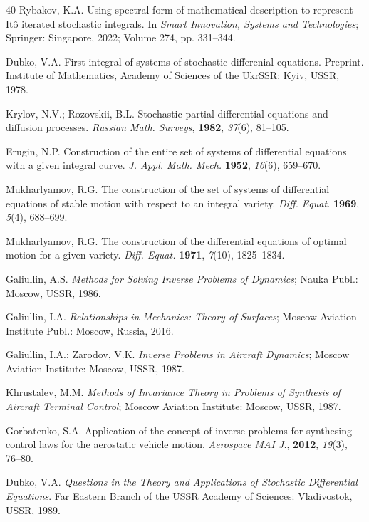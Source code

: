 \documentclass[10pt,reqno]{amsart}
\theoremstyle{plain}
\theoremstyle{remark}
\begin{document}
\begin{thebibliography}{40}
Rybakov, K.A. Using spectral form of mathematical description to represent It\^{o} iterated stochastic integrals. In {\em Smart Innovation, Systems and Technologies}; Springer: Singapore, 2022; Volume 274, pp. 331--344. %

Dubko, V.A. First integral of systems of stochastic differenial equations. Preprint. Institute of Mathematics, Academy of Sciences of the UkrSSR: Kyiv, USSR, 1978.

Krylov, N.V.; Rozovskii, B.L. Stochastic partial differential equations and diffusion processes. {\em Russian Math. Surveys}, {\bf 1982}, {\em 37}(6), 81--105.

Erugin, N.P. Construction of the entire set of systems of differential equations with a given integral curve. {\em J. Appl. Math. Mech.} {\bf 1952}, {\em 16}(6), 659--670.

Mukharlyamov, R.G. The construction of the set of systems of differential equations of stable motion with respect to an integral variety. {\em Diff. Equat.} {\bf 1969}, {\em 5}(4), 688--699.

Mukharlyamov, R.G. The construction of the differential equations of optimal motion for a given variety. {\em Diff. Equat.} {\bf 1971}, {\em 7}(10), 1825--1834.

Galiullin, A.S. {\em Methods for Solving Inverse Problems of Dynamics}; Nauka Publ.: Moscow, USSR, 1986.

Galiullin, I.A. {\em Relationships in Mechanics: Theory of Surfaces}; Moscow Aviation Institute Publ.: Moscow, Russia, 2016.

Galiullin, I.A.; Zarodov, V.K. {\em Inverse Problems in Aircraft Dynamics}; Moscow Aviation Institute: Moscow, USSR, 1987.

Khrustalev, M.M. {\em Methods of Invariance Theory in Problems of Synthesis of Aircraft Terminal Control}; Moscow Aviation Institute: Moscow, USSR, 1987.

Gorbatenko, S.A. Application of the concept of inverse problems for synthesing control laws for the aerostatic vehicle motion. {\em Aerospace MAI J.}, {\bf 2012}, {\em 19}(3), 76--80.

Dubko, V.A. {\em Questions in the Theory and Applications of Stochastic Differential Equations}. Far Eastern Branch of the USSR Academy of Sciences: Vladivostok, USSR, 1989.


\end{thebibliography}
\end{document}
